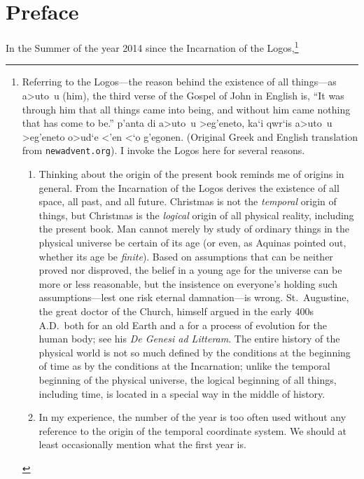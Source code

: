 
\chapter{Preface}

In the Summer of the year 2014 since the Incarnation of the Logos,\footnote{%
   Referring to the Logos---the reason behind the existence of all things---as
   {a>uto~u} (him), the third verse of the Gospel of John
   in English is, ``It was through him that all things came into being, and
   without him came nothing that has come to be.''
   {p'anta di a>uto~u >eg'eneto, ka`i qwr`is a>uto~u
   >eg'eneto o>ud`e <'en <`o g'egonen.} (Original Greek and English translation
   from \texttt{newadvent.org}).  I invoke the Logos here for several reasons.
   \begin{enumerate}
      \item Thinking about the origin of the present book reminds me of origins
         in general.  From the Incarnation of the Logos derives the existence
         of all space, all past, and all future.  Christmas is not the
         \emph{temporal} origin of things, but Christmas is the \emph{logical}
         origin of all physical reality, including the present book. Man cannot
         merely by study of ordinary things in the physical universe be certain
         of its age (or even, as Aquinas pointed out, whether its age be
         \emph{finite}).  Based on assumptions that can be neither proved nor
         disproved, the belief in a young age for the universe can be more or
         less reasonable, but the insistence on everyone's holding such
         assumptions---lest one risk eternal damnation---is wrong.
         St.~Augustine, the great doctor of the Church, himself argued in the
         early 400s A.D.~both for an old Earth and a for a process of evolution
         for the human body; see his {\it De Genesi ad Litteram}.  The entire
         history of the physical world is not so much defined by the conditions
         at the beginning of time as by the conditions at the Incarnation;
         unlike the temporal beginning of the physical universe, the logical
         beginning of all things, including time, is located in a special way
         in the middle of history.
      \item In my experience, the number of the year is too often used without
         any reference to the origin of the temporal coordinate system. We
         should at least occasionally mention what the first year is.

\end{enumerate}}
